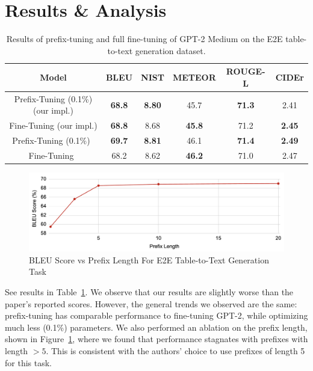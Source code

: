 \documentclass[11pt]{article} %
\begin{document}
\section{Results \& Analysis}

\begin{table}[H]
    \centering
    \begin{tabular}{c|ccccc}
        \textbf{Model} & \textbf{BLEU} & \textbf{NIST} & \textbf{METEOR} & \textbf{ROUGE-L} & \textbf{CIDEr} \\
        \hline
        Prefix-Tuning (0.1\%) (our impl.) & \textbf{68.8} & \textbf{8.80} & 45.7 & \textbf{71.3} & 2.41 \\
        Fine-Tuning (our impl.) & \textbf{68.8} & 8.68 & \textbf{45.8} & 71.2 & \textbf{2.45}\\
        \hline
        Prefix-Tuning (0.1\%)~\cite{li-liang-2021-prefix}  & \textbf{69.7} & \textbf{8.81} & 46.1 & \textbf{71.4} & \textbf{2.49} \\
        Fine-Tuning~\cite{li-liang-2021-prefix} & 68.2 & 8.62 & \textbf{46.2} & 71.0 & 2.47
    \end{tabular}
    \caption{Results of prefix-tuning and full fine-tuning of GPT-2 Medium on the E2E table-to-text generation dataset.}
    \label{tab:results}
\end{table}

\begin{figure}
    \centering
    \includegraphics[width=0.75\linewidth]{image.png}
    \caption{BLEU Score vs Prefix Length For E2E Table-to-Text Generation Task}
    \label{pref_len}
\end{figure}

See results in Table~\ref{tab:results}. We observe that our results are slightly worse than the paper's reported scores. However, the general trends we observed are the same: prefix-tuning has comparable performance to fine-tuning GPT-2, while optimizing much less (0.1\%) parameters. We also performed an ablation on the prefix length, shown in Figure~\ref{pref_len}, where we found that performance stagnates with prefixes with length $>5$. This is consistent with the authors' choice to use prefixes of length 5 for this task.
\end{document}

